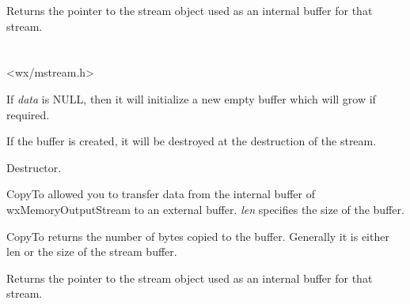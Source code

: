 \label{wxmemoryinputstreamgetistrmbuf}


Returns the pointer to the stream object used as an internal buffer
for that stream.

\section{}\label{wxmemoutputstream}




<wx/mstream.h>




\label{wxmemoryoutputstreamctor}


If {\it data} is NULL, then it will initialize a new empty buffer which will
grow if required.


If the buffer is created, it will be destroyed at the destruction of the
stream.

\label{wxmemoryoutputstreamdtor}


Destructor.

\label{wxmemoryoutputstreamcopyto}


CopyTo allowed you to transfer data from the internal buffer of
wxMemoryOutputStream to an external buffer. {\it len} specifies the size of
the buffer.


CopyTo returns the number of bytes copied to the buffer. Generally it is either
len or the size of the stream buffer.

\label{wxmemoryoutputstreamgetostrmbuf}


Returns the pointer to the stream object used as an internal buffer
for that stream.

